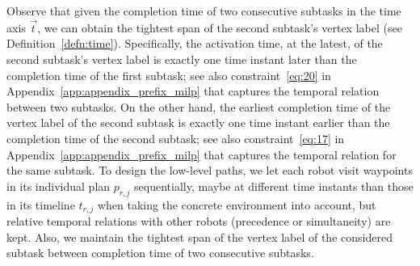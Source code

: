 \documentclass[Afour,sageh,times]{sagej}
\begin{document}
{ %

 {Observe that given the completion time of two consecutive subtasks in the time axis $\vec{t}$, we can obtain the tightest span of the second subtask's vertex label (see Definition~\ref{defn:time}). Specifically, the activation time, at the latest, of the second subtask's vertex label is exactly one time instant later than the completion time of the first subtask; see also constraint~\eqref{eq:20} in Appendix~\ref{app:appendix_prefix_milp} that captures the temporal relation between two subtasks. On the other hand, the earliest completion time of the vertex label of the second subtask is exactly one time instant earlier than the completion time of the second subtask; see also constraint~\eqref{eq:17} in Appendix~\ref{app:appendix_prefix_milp} that captures the temporal relation for the same subtask.  To design the low-level paths,  we let each robot visit waypoints in its individual plan $p_{r,j}$ sequentially, maybe at different time instants than those in its timeline $t_{r,j}$ when taking the concrete environment into account, but relative temporal relations with other robots (precedence or simultaneity) are kept. Also, we maintain the tightest span of the vertex label of the considered subtask between completion time of two consecutive subtasks.}



}
\end{document}

